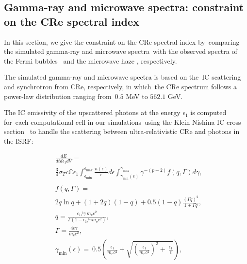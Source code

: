 \documentclass[twocolumn]{aastex631}
\begin{document}
\subsection{Gamma-ray and microwave spectra: constraint on the CRe spectral index}
\label{sec:gamma-ray-microwave}
In this section, we give the constraint on the CRe spectral index by\
comparing the simulated gamma-ray and microwave spectra\
with the observed spectra of the Fermi bubbles \citep{Ackermann2014}\
and the microwave haze \citep{Dobler_2008}, respectively.\

The simulated gamma-ray and microwave spectra is based on the\
IC scattering and synchrotron from CRe, respectively, in which\
the CRe spectrum follows a power-law distribution ranging from\
$0.5$ MeV to $562.1$ GeV.


The IC emissivity of the upscattered photons at the energy $\epsilon_{1}$ is computed for\
each computational cell in our simulations\
using the Klein-Nishina IC cross-section \citep{Jones1968,BLUMENTHAL1970}\
to handle the scattering between ultra-relativistic CRe and photons in the ISRF:

\begin{subequations}
  \begin{align}
  &\frac{dE}{dtd\epsilon_{1}dV} =\nonumber\\
               &\frac{3}{4}\sigma_{T}c\mathbb{C}\epsilon_{1}\int^{\epsilon_{\text{max}}}_{\epsilon_{\text{min}}}
               \frac{n(\epsilon)}{\epsilon}d\epsilon\int^{\gamma_{\text{max}}}_{\gamma_{\text{min}}\left(\epsilon\right)}
               \gamma^{-(p+2)}f(q, \Gamma)d\gamma,\\
  \nonumber\\
  &f(q, \Gamma) =\nonumber\\
               &2q\ln q+(1+2q)(1-q)+0.5(1-q)\frac{\left(\Gamma q\right)^2}{1+\Gamma q},\\
  &q=\frac{\epsilon_{1}/\gamma\
               m_{\text{e}}c^{2}}{\Gamma\left(1-\epsilon_{1}/\gamma m_{\text{e}}c^{2}\right)},\\
  &\Gamma=\frac{4\epsilon \gamma}{m_{\text{e}}c^2},\\
  &\gamma_{\text{min}}(\epsilon)=\
   0.5\left(\frac{\epsilon_{1}}{m_{\text{e}}c^2}+\sqrt{\left(\frac{\epsilon_{1}}{m_{\text{e}}c^2}\right)^2+\
   \frac{\epsilon_{1}}{\epsilon}}\right) \label{gamma-min},
  \end{align}
\label{gammaray-emissivity}
\end{subequations}
\end{document}
